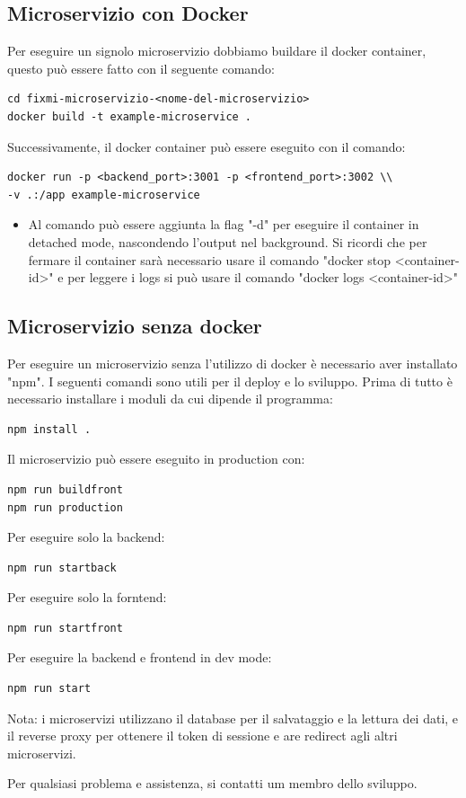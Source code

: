 \documentclass{report}
\begin{document}
\subsection*{Microservizio con Docker}
Per eseguire un signolo microservizio dobbiamo buildare il docker container, questo può essere fatto con il seguente comando:
\begin{verbatim}
cd fixmi-microservizio-<nome-del-microservizio>
docker build -t example-microservice .
\end{verbatim}
Successivamente, il docker container può essere eseguito con il comando:
\begin{verbatim}
docker run -p <backend_port>:3001 -p <frontend_port>:3002 \\
-v .:/app example-microservice
\end{verbatim}
\begin{itemize}
	\item Al comando può essere aggiunta la flag "-d" per eseguire il container in detached mode, nascondendo l'output nel background. Si ricordi che per fermare il container sarà necessario usare il comando "docker stop <container-id>" e per leggere i logs si può usare il comando "docker logs <container-id>"
\end{itemize}

\subsection*{Microservizio senza docker}
Per eseguire un microservizio senza l'utilizzo di docker è necessario aver installato "npm". I seguenti comandi sono utili per il deploy e lo sviluppo.
Prima di tutto è necessario installare i moduli da cui dipende il programma:
\begin{verbatim}
npm install .
\end{verbatim}
Il microservizio può essere eseguito in production con:
\begin{verbatim}
npm run buildfront
npm run production
\end{verbatim}
Per eseguire solo la backend:
\begin{verbatim}
npm run startback
\end{verbatim}
Per eseguire solo la forntend:
\begin{verbatim}
npm run startfront
\end{verbatim}
Per eseguire la backend e frontend in dev mode:
\begin{verbatim}
npm run start
\end{verbatim}
Nota: i microservizi utilizzano il database per il salvataggio e la lettura dei dati, e il reverse proxy per ottenere il token di sessione e are redirect agli altri microservizi.

Per qualsiasi problema e assistenza, si contatti um membro dello sviluppo.

	
\end{document}
